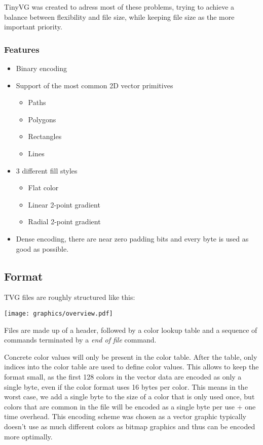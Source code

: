 \documentclass[]{article}
\providecommand{\tightlist}{%
  \setlength{\itemsep}{0pt}\setlength{\parskip}{0pt}}
\begin{document}
TinyVG was created to adress most of these problems, trying to achieve a
balance between flexibility and file size, while keeping file size as
the more important priority.

\hypertarget{features}{%
\subsubsection{Features}\label{features}}

\begin{itemize}
\tightlist
\item
  Binary encoding
\item
  Support of the most common 2D vector primitives

  \begin{itemize}
  \tightlist
  \item
    Paths
  \item
    Polygons
  \item
    Rectangles
  \item
    Lines
  \end{itemize}
\item
  3 different fill styles

  \begin{itemize}
  \tightlist
  \item
    Flat color
  \item
    Linear 2-point gradient
  \item
    Radial 2-point gradient
  \end{itemize}
\item
  Dense encoding, there are near zero padding bits and every byte is
  used as good as possible.
\end{itemize}

\hypertarget{format}{%
\subsection{Format}\label{format}}

TVG files are roughly structured like this:

\texttt{[image: graphics/overview.pdf]}

Files are made up of a header, followed by a color lookup table and a
sequence of commands terminated by a \emph{end of file} command.

Concrete color values will only be present in the color table. After the
table, only indices into the color table are used to define color
values. This allows to keep the format small, as the first 128 colors in
the vector data are encoded as only a single byte, even if the color
format uses 16 bytes per color. This means in the worst case, we add a
single byte to the size of a color that is only used once, but colors
that are common in the file will be encoded as a single byte per use +
one time overhead. This encoding scheme was chosen as a vector graphic
typically doesn't use as much different colors as bitmap graphics and
thus can be encoded more optimally.
\end{document}
